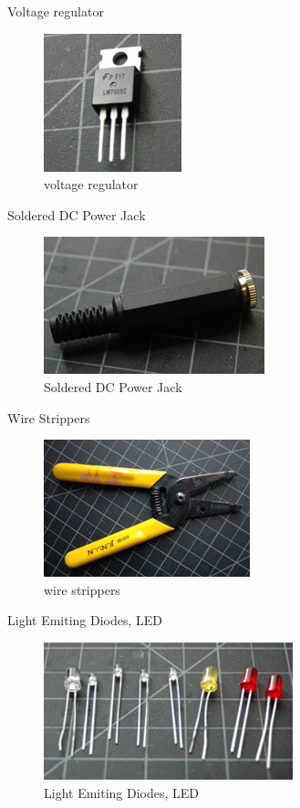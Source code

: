 Voltage regulator

\begin{figure}[!htb]
 \centering
 \includegraphics[scale=0.8]{img/electronics/voltage_reg.jpg}
 \caption{voltage regulator}
 \label{voltage regulator}
\end{figure}

Soldered DC Power Jack

\begin{figure}[!htb]
 \centering
 \includegraphics[scale=0.8]{img/electronics/power_connector.jpg}
 \caption{Soldered DC Power Jack}
 \label{Soldered DC Power Jack}
\end{figure}

Wire Strippers

\begin{figure}[!htb]
 \centering
 \includegraphics[scale=0.8]{img/electronics/wire_strippers.jpg}
 \caption{wire strippers}
 \label{wire strippers}
\end{figure}

Light Emiting Diodes, LED

\begin{figure}[!htb]
 \centering
 \includegraphics[scale=0.8]{img/electronics/leds.jpg}
 \caption{Light Emiting Diodes, LED}
 \label{Light Emiting Diodes, LED}
\end{figure}

